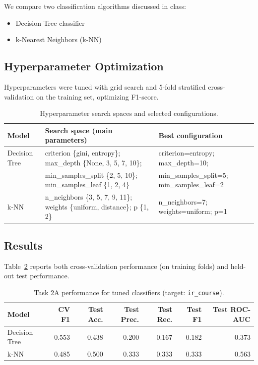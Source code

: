 \documentclass[runningheads]{llncs}
\begin{document}
We compare two classification algorithms discussed in class:
\begin{itemize}
\item Decision Tree classifier~\cite{breiman_1984}
\item k-Nearest Neighbors (k-NN)~\cite{cover_1967}
\end{itemize}

\subsection*{Hyperparameter Optimization}
Hyperparameters were tuned with grid search and 5-fold stratified cross-validation on the training set, optimizing F1-score.

\begin{table}
\caption{Hyperparameter search spaces and selected configurations.}
\label{tab:task2a_hyper}
\centering
\begin{tabular}{|l|l|l|}
\hline
Model & Search space (main parameters) & Best configuration \\
\hline
Decision Tree & criterion \{gini, entropy\}; max\_depth \{None, 3, 5, 7, 10\}; & criterion=entropy; max\_depth=10; \\
 & min\_samples\_split \{2, 5, 10\}; min\_samples\_leaf \{1, 2, 4\} & min\_samples\_split=5; min\_samples\_leaf=2 \\
\hline
k-NN & n\_neighbors \{3, 5, 7, 9, 11\}; weights \{uniform, distance\}; p \{1, 2\} & n\_neighbors=7; weights=uniform; p=1 \\
\hline
\end{tabular}
\end{table}

\subsection*{Results}
Table~\ref{tab:task2a_results} reports both cross-validation performance (on training folds) and held-out test performance.

\begin{table}
\caption{Task 2A performance for tuned classifiers (target: \texttt{ir\_course}).}
\label{tab:task2a_results}
\centering
\begin{tabular}{|l|r|r|r|r|r|r|}
\hline
Model & CV F1 & Test Acc. & Test Prec. & Test Rec. & Test F1 & Test ROC-AUC \\
\hline
Decision Tree & 0.553 & 0.438 & 0.200 & 0.167 & 0.182 & 0.373 \\
k-NN & 0.485 & 0.500 & 0.333 & 0.333 & 0.333 & 0.563 \\
\hline
\end{tabular}
\end{table}
\end{document}
